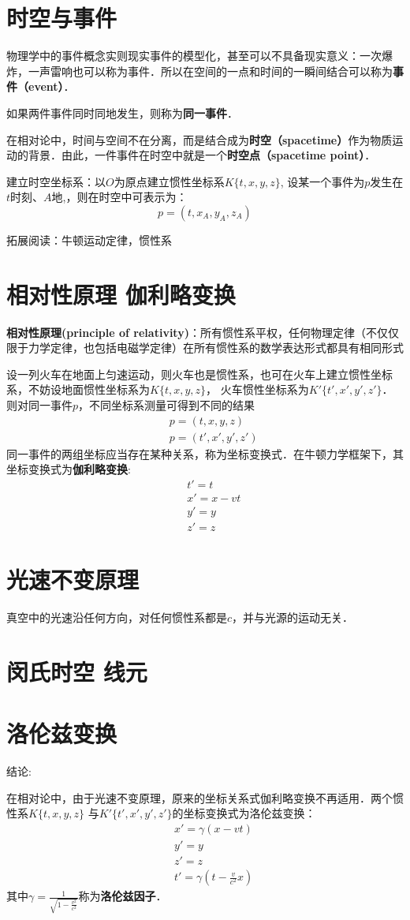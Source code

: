 \documentclass[11pt]{article}
\newcommand{\be}{\begin{equation}}
\newcommand{\ee}{\end{equation}}
\newcommand{\bea}{\setlength\arraycolsep{2pt} \begin{eqnarray}}
\newcommand{\eea}{\end{eqnarray}}
\numberwithin{equation}{section}
\begin{document}
\begin{CJK}{GBK}{song}
\section{时空与事件}
物理学中的事件概念实则现实事件的模型化，甚至可以不具备现实意义：一次爆炸，一声雷响也可以称为事件．所以在空间的一点和时间的一瞬间结合可以称为\textbf{事件（event）}．

如果两件事件同时同地发生，则称为\textbf{同一事件}．

在相对论中，时间与空间不在分离，而是结合成为\textbf{时空（spacetime）}作为物质运动的背景．由此，一件事件在时空中就是一个\textbf{时空点（spacetime point）}．

建立时空坐标系：以$O$为原点建立惯性坐标系$K\{t,x,y,z\}$, 设某一个事件为$p$发生在$t$时刻、$A$地,，则在时空中可表示为：
\be
p=(t,x_A,y_A,z_A)
\ee

拓展阅读：牛顿运动定律，惯性系
\section{相对性原理 伽利略变换}
\textbf{相对性原理(principle of relativity)}：所有惯性系平权，任何物理定律（不仅仅限于力学定律，也包括电磁学定律）在所有惯性系的数学表达形式都具有相同形式

设一列火车在地面上匀速运动，则火车也是惯性系，也可在火车上建立惯性坐标系，不妨设地面惯性坐标系为$K\{t,x,y,z\}$， 火车惯性坐标系为$K' \{t',x',y',z'\}$．则对同一事件$p$，不同坐标系测量可得到不同的结果
\bea
&&p=(t,x,y,z) \\
&&p=(t',x',y',z')
\eea
同一事件的两组坐标应当存在某种关系，称为坐标变换式．在牛顿力学框架下，其坐标变换式为\textbf{伽利略变换}:
\bea
&&t'=t \\
&&x'=x-vt \\
&&y'=y\\
&&z'=z
\eea
\section{光速不变原理}
真空中的光速沿任何方向，对任何惯性系都是$c$，并与光源的运动无关．
\section{闵氏时空 线元}
\section{洛伦兹变换}
结论:


在相对论中，由于光速不变原理，原来的坐标关系式伽利略变换不再适用．两个惯性系$K\{t,x,y,z\}$ 与$K' \{t',x',y',z'\}$的坐标变换式为洛伦兹变换：
\bea
&&x'=\gamma(x-vt)\\
&&y'=y\\
&&z'=z\\
&&t'=\gamma(t-\frac{v}{c^2}x)
\eea
其中$\gamma=\frac{1}{\sqrt{1-\frac{v^2}{c^2}}}$称为\textbf{洛伦兹因子}．



\end{CJK}
\end{document}
